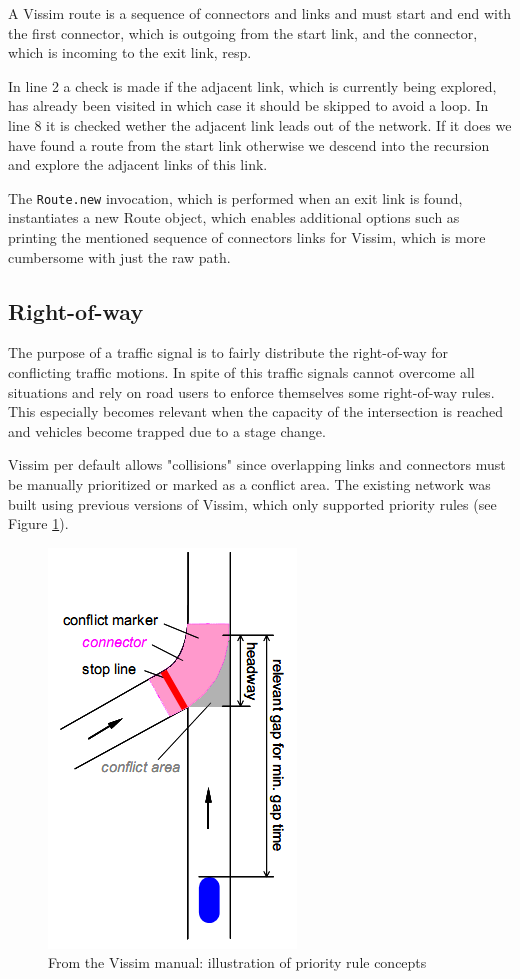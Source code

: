 A Vissim route is a sequence of connectors and links and must start and end with the first connector, which is outgoing from the start link, and the connector, which is incoming to the exit link, resp.

In line 2 a check is made if the adjacent link, which is currently being explored, has already been visited in which case it should be skipped to avoid a loop. In line 8 it is checked wether the adjacent link leads out of the network. If it does we have found a route from the start link otherwise we descend into the recursion and explore the adjacent links of this link.

The \verb|Route.new| invocation, which is performed when an exit link is found, instantiates a new Route object, which enables additional options such as printing the mentioned sequence of connectors links for Vissim, which is more cumbersome with just the raw path.

\clearpage

\subsection{Right-of-way}
The purpose of a traffic signal is to fairly distribute the right-of-way for conflicting traffic motions.  In spite of this traffic signals cannot overcome all situations and rely on road users to enforce themselves some right-of-way rules. This especially becomes relevant when the capacity of the intersection is reached and vehicles become trapped due to a stage change.

Vissim per default allows "collisions" since overlapping links and connectors must be manually prioritized or marked as a conflict area. The existing network was built using previous versions of Vissim, which only supported priority rules (see Figure \ref{fig:priority_rules}). 

\begin{figure}[ht]
\centering
\includegraphics[scale=0.5]{priority_rules.png} 
\caption{From the Vissim manual: illustration of priority rule concepts}
\label{fig:priority_rules}
\end{figure}

